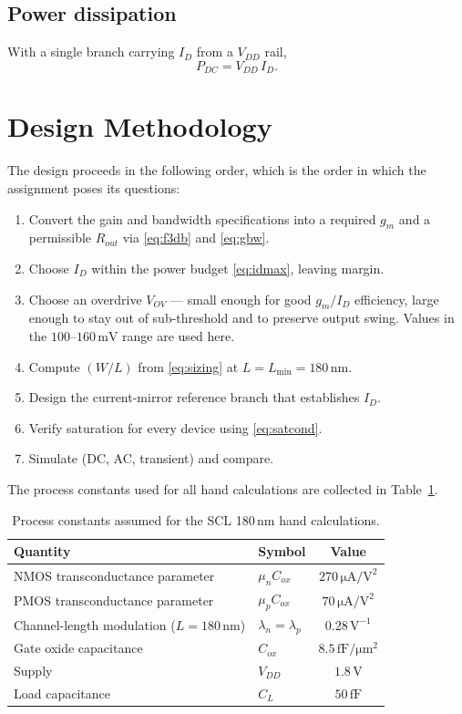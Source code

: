 \documentclass[12pt,a4paper]{article}
\newcommand{\U}[1]{\,\mathrm{#1}}
\begin{document}
\subsection{Power dissipation}
With a single branch carrying $I_D$ from a $V_{DD}$ rail,
\begin{equation}
P_{DC} = V_{DD}\,I_D .
\label{eq:power}
\end{equation}

\section{Design Methodology}
The design proceeds in the following order, which is the order in which the
assignment poses its questions:

\begin{enumerate}[leftmargin=2.0em,itemsep=2pt]
  \item Convert the gain and bandwidth specifications into a required
        $g_m$ and a permissible $R_{out}$ via \eqref{eq:f3db} and
        \eqref{eq:gbw}.
  \item Choose $I_D$ within the power budget \eqref{eq:idmax}, leaving margin.
  \item Choose an overdrive $V_{OV}$ --- small enough for good $g_m/I_D$
        efficiency, large enough to stay out of sub-threshold and to preserve
        output swing. Values in the $100$--$160\U{mV}$ range are used here.
  \item Compute $(W/L)$ from \eqref{eq:sizing} at $L = L_{\min} = 180\U{nm}$.
  \item Design the current-mirror reference branch that establishes $I_D$.
  \item Verify saturation for every device using \eqref{eq:satcond}.
  \item Simulate (DC, AC, transient) and compare.
\end{enumerate}

The process constants used for all hand calculations are collected in
Table~\ref{tab:proc}.

\begin{table}[H]
\centering
\caption{Process constants assumed for the SCL 180\,nm hand calculations.}
\label{tab:proc}
\begin{tabular}{llc}
\toprule
\textbf{Quantity} & \textbf{Symbol} & \textbf{Value} \\
\midrule
NMOS transconductance parameter & $\mu_n C_{ox}$ & $270\U{\mu A/V^2}$ \\
PMOS transconductance parameter & $\mu_p C_{ox}$ & $70\U{\mu A/V^2}$ \\
Channel-length modulation ($L=180\U{nm}$) & $\lambda_n=\lambda_p$ & $0.28\U{V^{-1}}$ \\
Gate oxide capacitance & $C_{ox}$ & $8.5\U{fF/\mu m^2}$ \\
Supply & $V_{DD}$ & $1.8\U{V}$ \\
Load capacitance & $C_L$ & $50\U{fF}$ \\
\bottomrule
\end{tabular}
\end{table}
\end{document}
